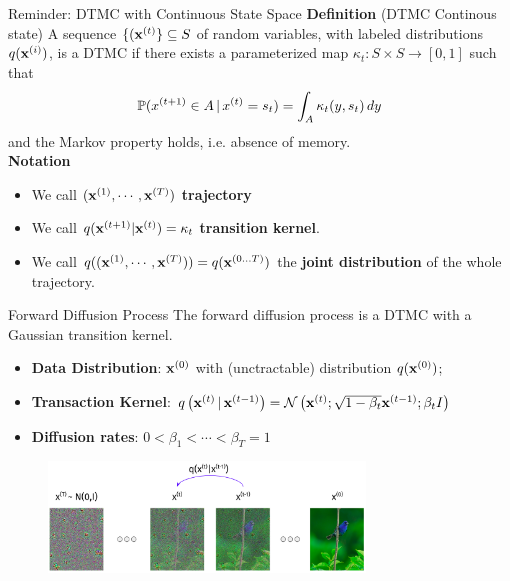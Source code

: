 \documentclass[aspectratio=169, 9pt]{beamer}
\theoremstyle{definition}
\begin{document}
\begin{frame}{Reminder: DTMC with Continuous State Space}
  \textbf{Definition} (DTMC Continous state)
  A sequence $\{(\mathbf{x}^{(t)}\}\subseteq S$ of random variables, with labeled distributions
    $q(\mathbf{x}^{(i)})$, is a DTMC if there exists a
        parameterized map $\kappa_t: S\times S\to [0,1]$ such that
        \[
          \mathbb{P}(x^{(t+1)} \in A\,|\, x^{(t)}=s_t) = \int_A \kappa_t(y,s_t)\, dy
        \]
        and the Markov property holds, i.e. absence of memory.\\
        \vspace{0.5cm}
  \textbf{Notation}\\
  \begin{itemize}
    \item We call $(\mathbf{x}^{(1)},\cdots,\mathbf{x}^{(T)})$ \textbf{trajectory}
    \item We call $q(\mathbf{x}^{(t+1)}|\mathbf{x}^{(t)}) = \kappa_t$ \textbf{transition
      kernel}.
    \item We call $q((\mathbf{x}^{(1)},\cdots,\mathbf{x}^{(T)}))=q(\mathbf{x}^{(0\ldots T)})$ the
      \textbf{joint distribution} of the whole trajectory.
  \end{itemize}
\end{frame}
\begin{frame}{Forward Diffusion Process}
  The forward diffusion process is a DTMC with a Gaussian transition kernel.
  \begin{itemize}
    \item \textbf{Data Distribution}: $\mathbf{x}^{(0)}$ with (unctractable)
      distribution $q(\mathbf{x}^{(0)})$;
      \hfill{}
    \item \textbf{Transaction Kernel}: $q\left( \mathbf{x}^{(t)}\,\vert\,\mathbf{x}^{(t-1)}
      \right)=\mathcal{N}\left( \mathbf{x}^{(t)};\sqrt{1-\beta_t}\mathbf{x}^{(t-1)}; \beta_t I \right)$
    \item \textbf{Diffusion rates}: $0<\beta_1<\cdots<\beta_T=1$ 
  \end{itemize}
  \begin{figure}[h!]
    \centering
    \includegraphics[width=0.75\textwidth]{./pic/forward-diffusion.png}
  \end{figure}
\end{frame}
\end{document}
